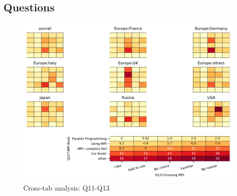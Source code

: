 
\subsection{Questions}


\begin{figure}
\begin{center}
\includegraphics[width=12cm]{../pdfs/Q11-Q13.pdf}
\caption{Cross-tab analysis: Q11-Q13}
\label{fig:Q11-Q13}
\end{center}
\end{figure}
